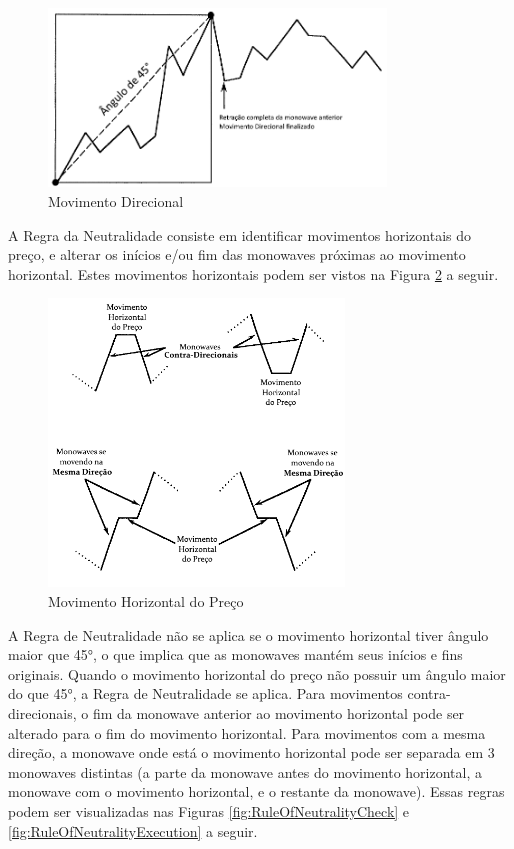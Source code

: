 \documentclass[12pt]{article}
\begin{document}
\begin{figure}[H]
	\centering
	\includegraphics[width=0.8\textwidth]{DirectionalMovement.png}
	\caption{Movimento Direcional}\label{fig:DirectionalMovement}
\end{figure}

A Regra da Neutralidade consiste em identificar movimentos horizontais do preço,
e alterar os inícios e/ou fim das monowaves próximas ao movimento horizontal. Estes movimentos
horizontais podem ser vistos na Figura \ref{fig:HorizontalPriceMovement} a seguir.

\begin{figure}[H]
	\centering
	\includegraphics[width=0.7\textwidth]{HorizontalPriceMovement.png}
	\caption{Movimento Horizontal do Preço}\label{fig:HorizontalPriceMovement}
\end{figure}

A Regra de Neutralidade não se aplica se o movimento horizontal tiver ângulo maior que
\ang{45}, o que implica que as monowaves mantém seus inícios e fins originais. Quando o
movimento horizontal do preço não possuir um ângulo maior do que \ang{45}, a Regra de
Neutralidade se aplica. Para movimentos contra-direcionais, o fim da monowave anterior ao 
movimento horizontal pode ser alterado para o fim do movimento horizontal. Para movimentos
com a mesma direção, a monowave onde está o movimento horizontal pode ser separada em 3
monowaves distintas (a parte da monowave antes do movimento horizontal, a monowave com o
movimento horizontal, e o restante da monowave). Essas regras podem ser visualizadas nas
Figuras \ref{fig:RuleOfNeutralityCheck} e \ref{fig:RuleOfNeutralityExecution} a seguir.
\end{document}

